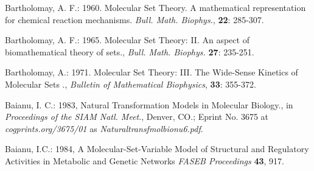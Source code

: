 \documentclass[12pt]{article}
\theoremstyle{plain}
\theoremstyle{definition}
\theoremstyle{plain}
\numberwithin{equation}{section}
\begin{document}
\begin{thebibliography}{9}

Bartholomay, A. F.: 1960. Molecular Set Theory. A mathematical representation for chemical reaction mechanisms. \emph{Bull. Math. Biophys.}, \textbf{22}: 285-307.

Bartholomay, A. F.: 1965. Molecular Set Theory: II. An aspect of biomathematical theory of sets., \emph{Bull. Math. Biophys.} \textbf{27}: 235-251.

Bartholomay, A.: 1971. Molecular Set Theory: III. The Wide-Sense Kinetics of Molecular Sets ., \emph{Bulletin of Mathematical Biophysics}, \textbf{33}: 355-372.

Baianu, I. C.: 1983, Natural Transformation Models in Molecular
Biology., in \emph{Proceedings of the SIAM Natl. Meet}., Denver,
CO.; Eprint No. 3675 at {\em cogprints.org/3675/01} as {\em Naturaltransfmolbionu6.pdf}.

Baianu, I.C.: 1984, A Molecular-Set-Variable Model of Structural
and Regulatory Activities in Metabolic and Genetic Networks
\emph{FASEB Proceedings} \textbf{43}, 917.

\end{thebibliography}
\end{document}
